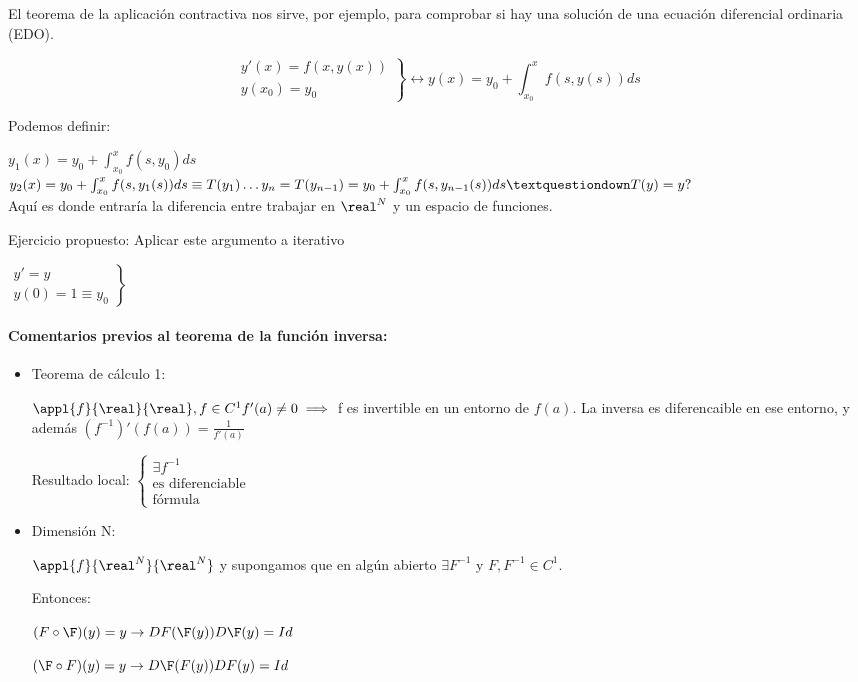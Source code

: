\documentclass{apuntes}
\begin{document}
El teorema de la aplicación contractiva nos sirve, por ejemplo, para comprobar si hay una solución de una ecuación diferencial ordinaria (EDO).

$$\left.\begin{matrix}y'(x) = f(x,y(x))\\
        y(x_0) = y_0
       \end{matrix}\right\} \leftrightarrow y(x) = y_0 + \int_{x_0}^x f(s,y(s)) ds$$

Podemos definir:

$y_1(x) = y_0 + \int_{x_0}^{x} f(s,y_0)ds$\\
$y_2(x) = y_0 + \int_{x_0}^x f(s,y_1(s))ds \equiv T(y_1)\\
\dots\\
y_n = T(y_{n-1}) =  y_0 + \int_{x_0}^x f(s,y_{n-1}(s))ds\\
¿T(y) = y?$\\
Aquí es donde entraría la diferencia entre trabajar en $\real^N$ y un espacio de funciones.

Ejercicio propuesto: Aplicar este argumento a iterativo

$\left. \begin{matrix} y' = y\\
         y(0) = 1 \equiv y_0
        \end{matrix}\right\}$

        
\paragraph{Comentarios previos al teorema de la función inversa:}
\begin{itemize}
 \item Teorema de cálculo 1:

$\appl{f}{\real}{\real}, f\in C^1 f'(a) \neq 0 \implies $ f es invertible en un entorno de $f(a)$. La inversa es diferencaible en ese entorno, y además $(f^{-1})'(f(a)) = \frac{1}{f'(a)}$

Resultado local: $\left\{\begin{matrix} \exists f^{-1} \\ \text{es diferenciable} \\ \text{fórmula}\end{matrix}\right.$

\item Dimensión N:

$\appl{f}{\real^N}{\real^N}$ y supongamos que en algún abierto $\exists F^{-1}$ y $F,F^{-1} \in  C^1$.

Entonces:

$(F\circ \F)(y) = y \rightarrow DF(\F(y))D\F(y) = Id$

$(\F\circ F)(y) = y \rightarrow D\F(F(y))DF(y) = Id$

\end{itemize}
\end{document}

